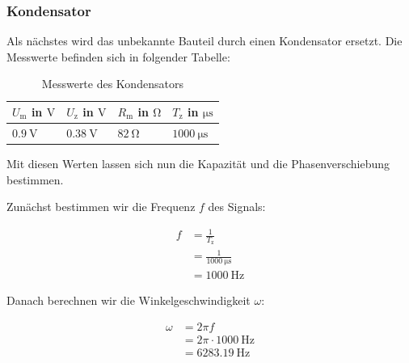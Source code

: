         \subsubsection{Kondensator}
            
            Als nächstes wird das unbekannte Bauteil durch einen Kondensator ersetzt. Die Messwerte befinden sich in folgender Tabelle:

            \begin{table}[H]
                \centering
                \caption{Messwerte des Kondensators}
                \vspace{1em}
                \begin{tabular}{|l|l|l|l|}
                    \hline
                    $U_{\mathrm{m}}$ in $\mathrm{V}$ & $U_{\mathrm{z}}$ in $\mathrm{V}$ & $R_{\mathrm{m}}$ in $\mathrm{\Omega}$ & $T_{\mathrm{z}}$ in $\mathrm{\mu s}$\\
                    \hline
                    \hline
                    $0.9\ \mathrm{V}$ & $0.38\ \mathrm{V}$ & $82\ \mathrm{\Omega}$ & $1000\ \mathrm{\mu s}$\\
                    \hline
                \end{tabular}
                \label{tab:Versuch2_Kondensator}
            \end{table}

            Mit diesen Werten lassen sich nun die Kapazität und die Phasenverschiebung bestimmen.
            
            Zunächst bestimmen wir die Frequenz $f$ des Signals:

            \begin{equation}
                \begin{aligned}
                    f &= \frac{1}{T_{\mathrm{z}}}\\
                      &= \frac{1}{1000\ \mathrm{\mu s}}\\
                      &= 1000\ \mathrm{Hz}
                \end{aligned}
                \label{eq:Versuch2_Kondensator_Frequenz}
            \end{equation}

            Danach berechnen wir die Winkelgeschwindigkeit $\omega$:

            \begin{equation}
                \begin{aligned}
                    \omega &= 2 \pi f\\
                           &= 2 \pi \cdot 1000\ \mathrm{Hz}\\
                           &= 6283.19\ \mathrm{Hz}
                \end{aligned}
                \label{eq:Versuch2_Kondensator_Winkelgeschwindigkeit}
            \end{equation}

